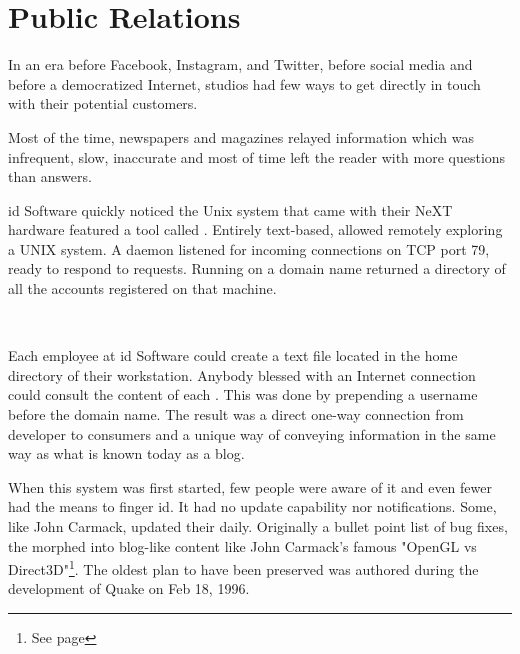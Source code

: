 \section{Public Relations}
In an era before Facebook, Instagram, and Twitter, before social media and before a democratized Internet, studios had few ways to get directly in touch with their potential customers.\\
\par Most of the time, newspapers and magazines relayed information which was infrequent, slow, inaccurate and most of time left the reader with more questions than answers.


id Software quickly noticed the Unix system that came with their NeXT hardware featured a tool called . Entirely text-based,  allowed remotely exploring a UNIX system. A  daemon listened for incoming connections on TCP port 79, ready to respond to requests. Running  on a domain name returned a directory of all the accounts registered on that machine.\\
\par
{}
\par
{}\\
\par

Each employee at id Software could create a  text file located in the home directory of their \NeXT workstation. Anybody blessed with an Internet connection could consult the content of each . This was done by prepending a username before the domain name. The result was a direct one-way connection from developer to consumers and a unique way of conveying information in the same way as what is known today as a blog.\\
\par
When this system was first started, few people were aware of it and even fewer had the means to finger id. It had no update capability nor notifications. Some, like John Carmack, updated their  daily. Originally a bullet point list of bug fixes, the  morphed into blog-like content like John Carmack's famous "OpenGL vs Direct3D"\footnote{See page \pageref{openglvsdirectd}}. The oldest plan to have been preserved was authored during the development of Quake on Feb 18, 1996.



